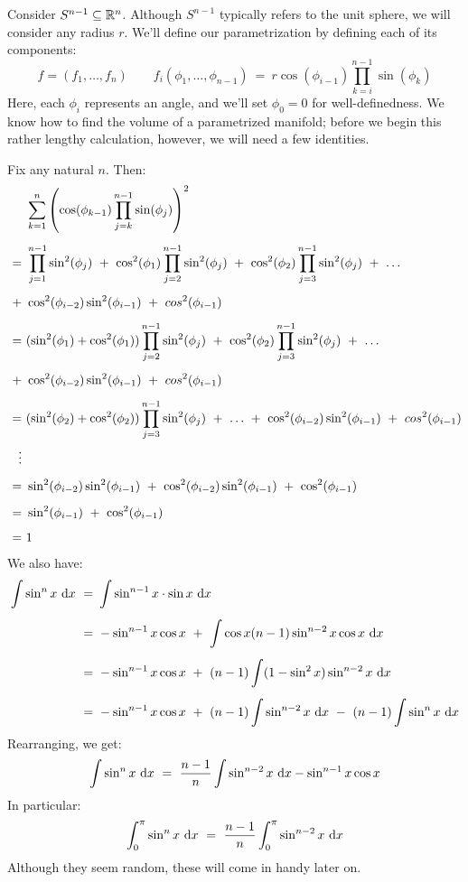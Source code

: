 \newpage
Consider $ S^{n-1} \subseteq \mathbb{R}^{n} $. Although $ S^{n-1} $ typically refers to
the unit sphere, we will consider any radius $ r $. We'll define our
parametrization by defining each of its components:
\begin{equation*}
    f = (f_{1}, \dots, f_{n}) \qquad
    f_{i}(\phi_{1},\dots,\phi_{n-1}) \ = \
    r\cos(\phi_{i-1})\prod_{k=i}^{n-1}\sin(\phi_{k})
\end{equation*}
Here, each $ \phi_{i} $ represents an angle, and we'll set $ \phi_{0} = 0 $ for
well-definedness. We know how to find the volume of a parametrized manifold;
before we begin this rather lengthy calculation, however, we will need a few
identities.
\begin{lm}
    Fix any natural $ n $. Then:
    \begin{align*}
        & \sum_{k=1}^{n}\left(\cos(\phi_{k-1})\prod_{j=k}^{n-1}\sin(\phi_{j})
        \right)^{2} \vsp 
        \ = \ & \prod_{j=1}^{n-1}\sin^{2}(\phi_{j}) \ + \ \cos^{2}(\phi_{1})
        \prod_{j=2}^{n-1}\sin^{2}(\phi_{j}) \ + \ \cos^{2}(\phi_{2})
        \prod_{j=3}^{n-1}\sin^{2}(\phi_{j}) \ + \ \dots \vsp
        \ + \ & \cos^{2}(\phi_{i-2})\sin^{2}(\phi_{i-1}) \ + \
        cos^{2}(\phi_{i-1}) \vsp
        \ = \ & (\sin^{2}(\phi_{1}) + \cos^{2}(\phi_{1}))
        \prod_{j=2}^{n-1}\sin^{2}(\phi_{j}) \ + \ \cos^{2}(\phi_{2})
        \prod_{j=3}^{n-1}\sin^{2}(\phi_{j}) \ + \ \dots \vsp
        \ + \ & \cos^{2}(\phi_{i-2})\sin^{2}(\phi_{i-1}) \ + \
        cos^{2}(\phi_{i-1}) \vsp
        \ = \ & (\sin^{2}(\phi_{2}) + \cos^{2}(\phi_{2}))
        \prod_{j=3}^{n-1}\sin^{2}(\phi_{j}) \ + \ \dots
        \ + \ \cos^{2}(\phi_{i-2})\sin^{2}(\phi_{i-1}) \ + \
        cos^{2}(\phi_{i-1}) \\
        \vdots \ & \vsp
        \ = \ & \sin^{2}(\phi_{i-2})\sin^{2}(\phi_{i-1}) \ + \
        \cos^{2}(\phi_{i-2})\sin^{2}(\phi_{i-1}) \ + \ \cos^{2}(\phi_{i-1}) \vsp
        \ = \ & \sin^{2}(\phi_{i-1}) \ + \ \cos^{2}(\phi_{i-1}) \vsp
        \ = \ & 1
    \end{align*}
    We also have:
    \begin{align*}
        \int\sin^{n}x\di x \ = \ & \int\sin^{n-1}x\cdot\sin x\di x \vsp
        \ = \ & -\sin^{n-1}x\cos x \ + \
        \int\cos x(n-1)\sin^{n-2}x \cos x\di x \vsp
        \ = \ & -\sin^{n-1}x\cos x \ + \
        (n-1)\int(1-\sin^{2}x) \sin^{n-2}x\di x \vsp
        \ = \ & -\sin^{n-1}x\cos x \ + \
        (n-1)\int\sin^{n-2}x\di x \ - \
        (n-1)\int\sin^{n}x\di x
    \end{align*}
    Rearranging, we get:
    \begin{equation*}
        \int\sin^{n}x\textrm{ d} x \ = \
        \frac{n-1}{n}\int\sin^{n-2}x\textrm{ d} x - \sin^{n-1}x\cos x
    \end{equation*}
    In particular:
    \begin{equation*}
        \int_{0}^{\pi}\sin^{n}x\textrm{ d} x \ = \
        \frac{n-1}{n}\int_{0}^{\pi}\sin^{n-2}x\textrm{ d} x
    \end{equation*}
    Although they seem random, these will come in handy later on.
\end{lm}
